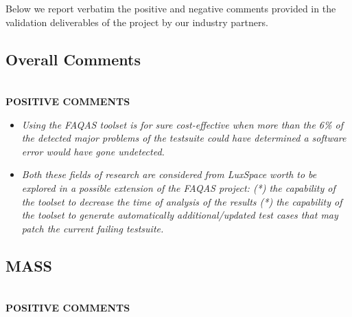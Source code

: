 Below we report verbatim the positive and negative comments provided in the validation deliverables of the project by our industry partners.


\subsection{Overall Comments}\ \\

\textbf{POSITIVE COMMENTS}

\begin{itemize}
  \item \emph{Using the FAQAS toolset is for sure cost-effective when more than the 6\% of the detected major problems of the testsuite could have determined a software error would have gone undetected. }

  \item \emph{Both these fields of research are considered from LuxSpace worth to be explored in a possible extension of the FAQAS project:
  (*) the capability of the toolset to decrease the time of analysis of the results (*) the capability of the toolset to generate automatically additional/updated test cases that may patch the current failing testsuite.}
\end{itemize}

\subsection{MASS}\ \\

\textbf{POSITIVE COMMENTS}


